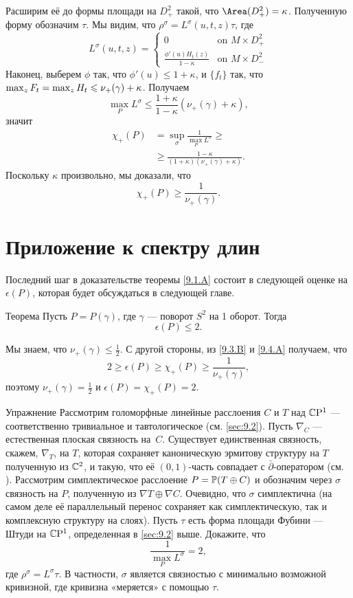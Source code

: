 Расширим её до формы площади на $D_+^2$ такой, что $\Area (D_+^2) = \kappa$.
Полученную форму обозначим $\tau$.
Мы видим, что $\rho^\sigma = L^\sigma (u, t, z)\tau$, где 
\[
L^\sigma(u,t,z)=
\begin{cases}
0&\text{on\ } M\times D^2_+
\\
\frac{\phi'(u)H_t(z)}{1-\kappa}&\text{on\ } M\times D^2_-
\end{cases}
\]
Наконец, выберем $\phi$ так, что $\phi' (u) \le 1 + \kappa$, и
$\{f_t\}$ так, что $\max_z F_t \z= \max_z H_t \le \nu_+ (\gamma) +
\kappa$. 
Получаем
\[\max_P L^\sigma \le  \frac{1+\kappa}{1-\kappa} (\nu_+ (\gamma) + \kappa),\]
значит 
\begin{align*}
\chi_+ (P) &= \sup_\sigma \frac1{\max_PL^\sigma}\ge
\\
&\ge\frac{1-\kappa}{(1 + \kappa)(\nu_+ (\gamma) + \kappa)}. 
\end{align*}
Поскольку $\kappa$ произвольно, мы доказали, что 
\[\chi_+ (P) \ge \frac{1}{\nu_+ (\gamma)}.\]
\qeds

\section{Приложение к спектру длин}\label{sec:9.4}

Последний шаг в доказательстве теоремы \ref{9.1.A} состоит в следующей
оценке на $\epsilon(P)$, которая будет обсуждаться в следующей главе.


\begin{thm}{Теорема}\label{9.4.A}
Пусть $P = P(\gamma)$, где $\gamma$ --- поворот $S^2$ на 1 оборот.
Тогда
\[\epsilon(P) \le 2.\]
\end{thm}

Мы знаем, что $\nu_+ (\gamma) \le \tfrac12$.
С другой стороны, из \ref{9.3.B} и \ref{9.4.A} получаем, что
\[2 \ge \epsilon(P) \ge \chi_+ (P) \ge\frac1{\nu_+(\gamma)},\]
поэтому $\nu_+ (\gamma) = \tfrac12$ и $\epsilon(P) = \chi_+ (P) = 2$.
\qeds

\begin{ex}{Упражнение}
Рассмотрим голоморфные линейные расслоения $C$ и $T$ над $\mathbb{C}\mathrm{P}^1$ ---
соответственно тривиальное и тавтологическое (см. \ref{sec:9.2}). 
Пусть $\nabla_C$ --- естественная плоская связность на~$C$.
Существует единственная связность, скажем, $\nabla_T$, на $T$, которая
сохраняет каноническую эрмитову структуру  на $T$ полученную из
$\mathbb{C}^2$, и такую, что её $(0,1)$-часть совпадает с
$\bar\partial$-оператором (см. \cite{GH}). 
Рассмотрим симплектическое расслоение $P = \mathbb{P}(T \oplus C)$ и
обозначим через $\sigma$ связность на $P$, полученную из $\nabla T
\oplus \nabla C$. 
Очевидно, что $\sigma$ симплектична (на самом деле её параллельный
перенос сохраняет как симплектическую, так и комплексную структуру на
слоях). 
Пусть $\tau$ есть форма площади Фубини --- Штуди на $\mathbb{C}\mathrm{P}^1$,
определенная в \ref{sec:9.2} выше. 
Докажите, что 
\[\frac1{\max_P L^\sigma}=2,\]
где $\rho^\sigma = L^\sigma \tau$.
В частности, $\sigma$ является связностью с минимально возможной
кривизной, где кривизна «меряется» с  помощью $\tau$.  
\end{ex}
